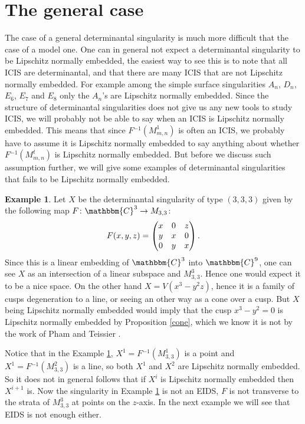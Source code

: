 \documentclass[a4paper,oneside]{amsart}
\theoremstyle{definition}
\newtheorem{ex}[thm]{Example}
\begin{document}
\section{The general case}\label{secgeneralcase}

The case of a general determinantal singularity is much more difficult
that the case of a model one. One can in general not expect a determinantal
singularity to be Lipschitz normally embedded, the easiest way to see
this is to note that all ICIS are determinantal, and that there are
many ICIS that are not Lipschitz normally embedded. For example
among the simple surface singularities $A_n$, $D_n$, $E_6$, $E_7$ and
$E_8$ only the $A_n$'s are Lipschitz normally embedded. Since the
structure of determinantal singularities does not give us any new
tools to study ICIS, we will probably not be able to say when an ICIS
is Lipschitz normally embedded. This means that since $F{^{-1}}({M^{ {1} }_{m,n}})$
is often an ICIS, we probably have to assume it is Lipschitz normally
embedded to say 
anything about whether $F{^{-1}}({M^{ {t} }_{m,n}})$ is Lipschitz normally
embedded. But before we discuss such assumption further, we will give
some examples of determinantal singularities that fails to be
Lipschitz normally embedded. 

\begin{ex}\label{degenerationofcusps}
Let $X$ be the determinantal singularity of type $(3,3,3)$ given by
the following map ${ {F} \colon {{\mathbbm{C}}^3} \to {M_{3,3}}}$:
\begin{align*}
F(x,y,z)=\left(
\begin{array}{@{} c c c @{}}
x & 0 & z \\ 
y & x & 0 \\ 
0 & y & x
\end{array}
\right).
\end{align*}
Since this is a linear embedding of ${\mathbbm{C}}^3$ into ${\mathbbm{C}}^9$, one can see
$X$ as an intersection of a linear subspace and $M^{3}_{3,3}$. Hence
one would expect it to be a nice space. On the other hand
$X=V(x^3-y^2z)$, hence it is a family of cusps degeneration to a
line, or seeing an other way as a cone over a cusp. But $X$ being
Lipschitz normally embedded would imply that the cusp $x^3-y^2=0$ 
is Lipschitz normally embedded by
Proposition \ref{cone}, which we know it is
not by the work of Pham and Teissier \cite{phamteissier}.
\end{ex}   

Notice that in the Example \ref{degenerationofcusps},
$X^1=F{^{-1}}(M^{1}_{3,3})$ is a point and $X^1=F{^{-1}}(M^{2}_{3,3})$ is
a line, so both $X^1$ and $X^2$ are Lipschitz normally embedded. So it
does not in general follows that if $X^i$ is Lipschitz normally
embedded then $X^{i+1}$ is. Now the singularity in Example
\ref{degenerationofcusps} is not an EIDS, $F$ is not transverse to the
strata of $M^3_{3,3}$ at points on the $z$-axis. In the next example
we will see that EIDS is not enough either.
\end{document}
